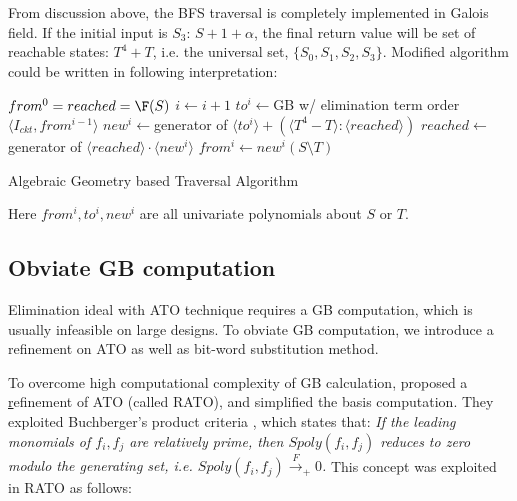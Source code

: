 \begin{Example}
From discussion above, the BFS traversal is completely implemented in Galois field.
If the initial input is $S_3$: $S + 1 + \alpha$, the final return value will be set of
reachable states: $T^4 + T$, i.e. the universal set, $\{S_0, S_1, S_2, S_3\}$. Modified algorithm could be
written in following interpretation:

\begin{algorithm}[hbt]
\SetAlgoNoLine

  $from^0 = reached = \F(S)$\;
  {
  	$i \gets i + 1$\;
	$to^i \gets$GB w/ elimination term order$\langle I_{ckt}, from^{i-1}\rangle$\;
	$new^i \gets $generator of $\langle to^i\rangle + (\langle T^4-T\rangle:\langle reached\rangle)$\;
  	$reached \gets $generator of $\langle reached\rangle \cdot \langle new^i\rangle$\;
	$from^i \gets new^i(S\setminus T)$\;
  }
\caption {Algebraic Geometry based Traversal Algorithm}\label{alg:univa}
\end{algorithm}

Here $from^i, to^i, new^i$ are all univariate polynomials about $S$ or $T$.
\end{Example}

\subsection{Obviate GB computation}
Elimination ideal with ATO technique requires a GB computation, which is usually infeasible on large designs.
To obviate GB computation, we introduce a refinement on ATO as well as bit-word substitution method.

To overcome high computational complexity of GB calculation, \cite{pruss:dac14} proposed a
\underline{r}efinement of ATO (called RATO), and simplified the
\Grobner basis computation. They exploited Buchberger's product
criteria \cite{productc:1979}, which states that: {\it If the leading  
monomials of $f_i, f_j$ are relatively prime, then $Spoly(f_i, f_j)$
reduces to zero modulo the generating set, i.e. $Spoly(f_i, f_j)
\xrightarrow{F} _+ 0$.} This concept was exploited in RATO as follows: 

